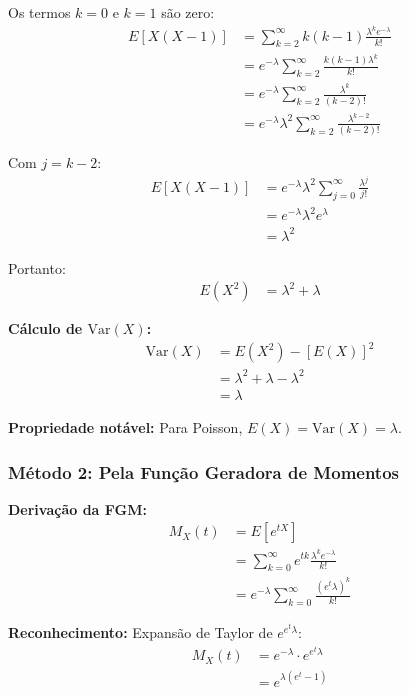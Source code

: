 \documentclass[12pt,a4paper]{article}
\theoremstyle{plain}
\theoremstyle{definition}
\theoremstyle{remark}
\begin{document}
Os termos \(k=0\) e \(k=1\) são zero:
\begin{align}
E[X(X-1)] &= \sum_{k=2}^{\infty} k(k-1) \frac{\lambda^k e^{-\lambda}}{k!} \\
&= e^{-\lambda} \sum_{k=2}^{\infty} \frac{k(k-1) \lambda^k}{k!} \\
&= e^{-\lambda} \sum_{k=2}^{\infty} \frac{\lambda^k}{(k-2)!} \\
&= e^{-\lambda} \lambda^2 \sum_{k=2}^{\infty} \frac{\lambda^{k-2}}{(k-2)!}
\end{align}

Com \(j = k-2\):
\begin{align}
E[X(X-1)] &= e^{-\lambda} \lambda^2 \sum_{j=0}^{\infty} \frac{\lambda^j}{j!} \\
&= e^{-\lambda} \lambda^2 e^{\lambda} \\
&= \lambda^2
\end{align}

Portanto:
\begin{align}
E(X^2) &= \lambda^2 + \lambda
\end{align}

\textbf{Cálculo de \(\text{Var}(X)\):}
\begin{align}
\text{Var}(X) &= E(X^2) - [E(X)]^2 \\
&= \lambda^2 + \lambda - \lambda^2 \\
&= \lambda
\end{align}

\textbf{Propriedade notável:} Para Poisson, \(E(X) = \text{Var}(X) = \lambda\).

\subsubsection{Método 2: Pela Função Geradora de Momentos}

\textbf{Derivação da FGM:}
\begin{align}
M_X(t) &= E[e^{tX}] \\
&= \sum_{k=0}^{\infty} e^{tk} \frac{\lambda^k e^{-\lambda}}{k!} \\
&= e^{-\lambda} \sum_{k=0}^{\infty} \frac{(e^t \lambda)^k}{k!}
\end{align}

\textbf{Reconhecimento:} Expansão de Taylor de \(e^{e^t\lambda}\):
\begin{align}
M_X(t) &= e^{-\lambda} \cdot e^{e^t\lambda} \\
&= e^{\lambda(e^t - 1)}
\end{align}
\end{document}
